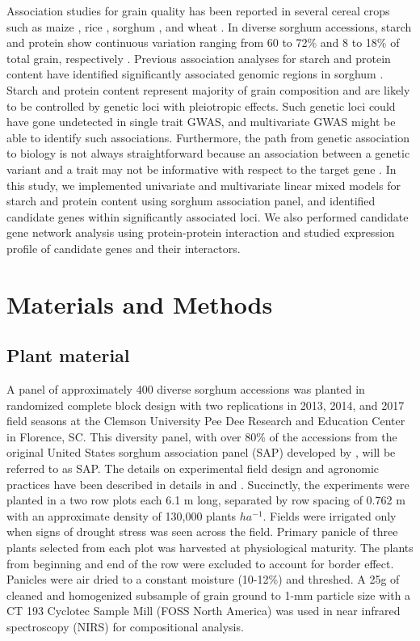 \documentclass[10pt,letterpaper]{article}
\begin{document}
Association studies for grain quality has been reported in several cereal crops such as maize \parencite{wilson2004dissection,cook2012genetic}, rice \parencite{zhao2011genome,wang2017genome}, sorghum \parencite{sukumaran2012association,rhodes2017genetic}, and wheat \parencite{reif2011association,gaire2019association}. In diverse sorghum accessions, starch and protein show continuous variation ranging from 60 to 72\% and 8 to 18\% of total grain, respectively \parencite{rhodes2017genetic}. Previous association analyses for starch and protein content have identified significantly associated genomic regions in sorghum \parencite{sukumaran2012association,rhodes2017genetic,boyles2017genetic}. Starch and protein content represent majority of grain composition and are likely to be controlled by genetic loci with pleiotropic effects. Such genetic loci could have gone undetected in single trait GWAS, and multivariate GWAS might be able to identify such associations. Furthermore, the path from genetic association to biology is not always straightforward because an association between a genetic variant and a trait may not be informative with respect to the target gene \parencite{gallagher2018post}. In this study, we implemented univariate and multivariate linear mixed models for starch and protein content using sorghum association panel, and identified candidate genes within significantly associated loci. We also performed candidate gene network analysis using protein-protein interaction and studied expression profile of candidate genes and their interactors.

\section*{Materials and Methods}
\label{sec:materials:methods}
\subsection*{Plant material}
A panel of approximately 400 diverse sorghum accessions was planted in randomized complete block design with two replications in 2013, 2014, and 2017 field seasons at the Clemson University Pee Dee Research and Education Center in Florence, SC. This diversity panel, with over 80\% of the accessions from the original United States sorghum association panel (SAP) developed by \citet{casa2008community}, will be referred to as SAP. The details on experimental field design and agronomic practices have been described in details in \citet{boyles2016genome} and \citet{sapkota2020}. Succinctly, the experiments were planted in a two row plots each 6.1 m long, separated by row spacing of 0.762 m with an approximate density of 130,000 plants $ha^{-1}$. Fields were irrigated only when signs of drought stress was seen across the field. Primary panicle of three plants selected from each plot was harvested at physiological maturity. The plants from beginning and end of the row were excluded to account for border effect. Panicles were air dried to a constant moisture (10-12\%) and threshed. A 25g of cleaned and homogenized subsample of grain ground to 1-mm particle size with a CT 193 Cyclotec Sample Mill (FOSS North America) was used in near infrared spectroscopy (NIRS) for compositional analysis.
\end{document}
